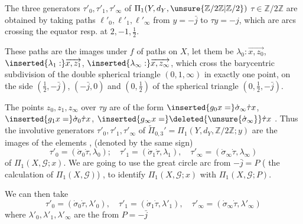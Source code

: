 The three  generators
 $\tau'_0,\tau'_1,\tau'_\infty$
of $\Pi_1(Y,d_Y,
\unsure{\mathbb Z/2\mathbb Z|\mathbb Z/2})$
 $\tau\in\mathbb Z/2\mathbb Z$
are obtained by taking paths $\ell'_0,\ell'_1,\ell'_\infty$
from  $y=-\bar j$ to
 $\tau y=-j$, which are 
 arcs crossing the equator resp. at $2,-1,\frac12$.



These paths are the images under $f$ of paths
on $X$, let them be $\lambda_0:\overrightarrow{x,z_0}$,
$\inserted{\lambda_1:}\overrightarrow{x,z_1}$,
$\inserted{\lambda_\infty:}\overrightarrow{x,z_\infty}$,
which  cross the barycentric subdivision of the double
spherical triangle $(0,1,\infty)$ in exactly one point,
  on the side
$(\frac12,-\bar j)$, $(-\bar j,0)$ and $(0,\frac12)$
of the spherical triangle $(0,\frac12,-\bar j)$.


The points  $z_0,z_1,z_\infty$ over
$\tau y$ are  of the form
$\inserted{g_0x=}\dot\sigma_\infty\dot\tau x$,
$\inserted{g_1x=}\dot\sigma_0\dot\tau x$,
$\inserted{g_\infty x=}\deleted{\unsure{\dot\sigma_\infty}}\dot\tau x$
.
Thus the involutive generators
$\tau'_0,\tau'_1,\tau'_\infty$ of
$\widetilde\Pi_{0,3}'=\Pi_1(Y,d_Y,\mathbb Z/2\mathbb Z;y)$
are the images of the elements
,
(denoted by the same sign)
\[
\tau'_0=(\dot\sigma_0\dot\tau,\lambda_0);\quad
\tau'_1=(\dot\sigma_1\dot\tau,\lambda_1),\quad
\tau'_\infty=(\dot\sigma_\infty\dot\tau,\lambda_\infty)
\]
of $\Pi_1(X,\mathcal G;x)$.
We are going to use the great circle arc \inserted{$\ell$}
from  $-\bar j=P$
( 
  the calculation of $\Pi_1(X,\mathcal G)$)
, to identify $\Pi_1(X,\mathcal G;x)$
with $\Pi_1(X,\mathcal G;P)$.

We can then take 
\[
\tag{21}
\tau'_0=(\dot\sigma_0\dot\tau,\lambda'_0),\quad
\tau'_1=(\dot\sigma_1\dot\tau,\lambda'_1),\quad
\tau'_\infty=(\dot\sigma_\infty\dot\tau,\lambda'_\infty)
\]
where $\lambda'_0,\lambda'_1,\lambda'_\infty$ are the
from $P=-\bar j$


